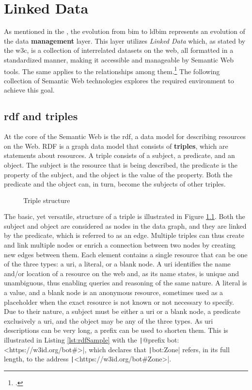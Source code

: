 \chapter{Linked Data} \label{ch:linkedData}
As mentioned in the , the evolution from \ac{bim} to \ac{ldbim} represents an evolution of the data \textbf{management} layer. This layer utilizes \emph{Linked Data} which, as stated by the \ac{w3c}, is a collection of interrelated datasets on the web, all formatted in a standardized manner, making it accessible and manageable by Semantic Web tools. The same applies to the relationships among them.\footcite{w3c} The following collection of Semantic Web technologies explores the required environment to achieve this goal.

\section{\acs{rdf} and triples} \label{subsec:rdfAndTriples}
At the core of the Semantic Web is the \ac{rdf}, a data model for describing resources on the Web. RDF is a graph data model that consists of \textbf{triples}, which are statements about resources. A triple consists of a subject, a predicate, and an object. The subject is the resource that is being described, the predicate is the property of the subject, and the object is the value of the property. Both the predicate and the object can, in turn, become the subjects of other triples.

\begin{figure}[H]
    \centering
    
    \caption{Triple structure}
    \label{fig:triple}
\end{figure}

The basic, yet versatile, structure of a triple is illustrated in Figure \ref{fig:triple}. Both the subject and object are considered as nodes in the data graph, and they are linked by the predicate, which is referred to as an edge. Multiple triples can thus create and link multiple nodes or enrich a connection between two nodes by creating new edges between them. Each element contains a single resource that can be one of the three types: a \acs{uri}, a literal, or a blank node. A \ac{uri} identifies the name and/or location of a resource on the web and, as its name states, is unique and unambiguous, thus enabling queries and reasoning of the same nature. A literal is a value, and a blank node is an anonymous resource, sometimes used as a placeholder when the exact resource is not known or not necessary to specify. Due to their nature, a subject must be either a \ac{uri} or a blank node, a predicate exclusively a \ac{uri}, and the object may be any of the three types. As \ac{uri} descriptions can be very long, a prefix can be used to shorten them. This is illustrated in Listing \ref{lst:rdfSample} with the \texttt|@prefix bot: <https://w3id.org/bot#>|, which declares that \texttt|bot:Zone| refers, in its full length, to the address \texttt|<https://w3id.org/bot#Zone>|.

